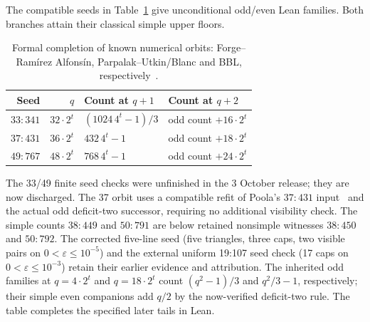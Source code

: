 \begin{corollary}\label{jfam:known}
The compatible seeds in Table~\ref{jfam:orbits} give unconditional odd/even Lean families. Both branches attain their classical simple upper floors.
\end{corollary}
\begin{table}[tb]
\centering\small
\begin{tabular}{@{}rrll@{}}
\toprule
Seed & $q$ & Count at $q+1$ & Count at $q+2$\\\midrule
$33:341$ & $32\cdot2^t$ & $(1024\,4^t-1)/3$ & odd count $+16\cdot2^t$\\
$37:431$ & $36\cdot2^t$ & $432\,4^t-1$ & odd count $+18\cdot2^t$\\
$49:767$ & $48\cdot2^t$ & $768\,4^t-1$ & odd count $+24\cdot2^t$\\
\bottomrule
\end{tabular}
\caption{Formal completion of known numerical orbits: Forge--Ram\'irez Alfons\'in, Parpalak--Utkin/Blanc and BBL, respectively~\cite{forge1998,parpalakutkin2026,blanc2011,bbl2008}.}\label{jfam:orbits}
\end{table}
The 33/49 finite seed checks were unfinished in the 3 October release; they are now discharged. The 37 orbit uses a compatible refit of Poola's $37:431$ input~\cite{poola2026} and the actual odd deficit-two successor, requiring no additional visibility check. The simple counts $38:449$ and $50:791$ are below retained nonsimple witnesses $38:450$ and $50:792$. The corrected five-line seed (five triangles, three caps, two visible pairs on $0<\varepsilon\le10^{-5}$) and the external uniform 19:107 seed check (17 caps on $0<\varepsilon\le10^{-3}$) retain their earlier evidence and attribution. The inherited odd families at $q=4\cdot2^t$ and $q=18\cdot2^t$ count $(q^2-1)/3$ and $q^2/3-1$, respectively; their simple even companions add $q/2$ by the now-verified deficit-two rule. The table completes the specified later tails in Lean.

